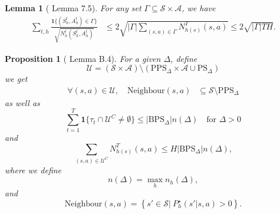 \documentclass[twoside]{article}
\newtheorem{lemma}{Lemma}
\newtheorem{proposition}{Proposition}
\newcommand{\BPS}{\mathrm{BPS}_{\Delta}} %
\newcommand{\PPS}{\mathrm{PPS}_{\Delta}} %
\newcommand{\PS}{\mathrm{PS}_{\Delta}} %
\begin{document}
\begin{lemma}[\cite{agarwal2019reinforcement} Lemma 7.5]
For any set \( \Gamma \subseteq \mathcal{S}\times\mathcal{A} \), we have
\begin{align}
    \sum_{t,h}\frac{\mathbf{1}\{(S_h^t,A_h^t)\in\Gamma \}}{\sqrt{N_h^t(S_h^t,A_h^t)}}
    &\le 2 \sqrt{|\Gamma | \sum_{(s,a)\in\Gamma }N^{T}_{h(s)}(s,a)}\le 2\sqrt{|\Gamma |TH}.
    \label{eq:U_sum_sqrt_N_inv}
\end{align}
\end{lemma}

\begin{proposition}[\cite{gupta_unpacking_2022} Lemma B.4]
For a given \( \Delta \), define 
\begin{equation}
\mathcal{U}
=(\mathcal{S}\times\mathcal{A}) \setminus (\PPS\times\mathcal{A}
\cup \PS)
\end{equation}
we get 
\begin{align}
    \forall (s,a)\in\mathcal{U}, \quad \mathrm{Neighbour}(s,a)
    &\subseteq \mathcal{S}\setminus \PPS
    \label{eq:U_neighbour_condition}
\end{align}
as well as
\begin{equation}\label{eq:trajectory_intersection_bound}
\sum_{t=1}^{T}
\mathbf{1}\{\tau_{t}\cap\mathcal{U}^{C}\neq\emptyset\}\le
|\BPS| n(\Delta)\quad \text{for } \Delta>0
\end{equation}
and
\begin{equation}\label{eq:total_visitation_via_boundary}
\sum_{(s,a)\in \mathcal{U}^{C}}N^{T}_{h(s)}(s,a)
\le H|\BPS| n(\Delta), 
\end{equation}
where we define 
\[n(\Delta)=\max_{h} n_h(\Delta),\]
and 
\[
\mathrm{Neighbour}(s,a) = \left \lbrace s' \in \mathcal{S} \vert ~ P^\star_h(s' \vert s,a) > 0 \right \rbrace. 
\]
\end{proposition}
\end{document}
